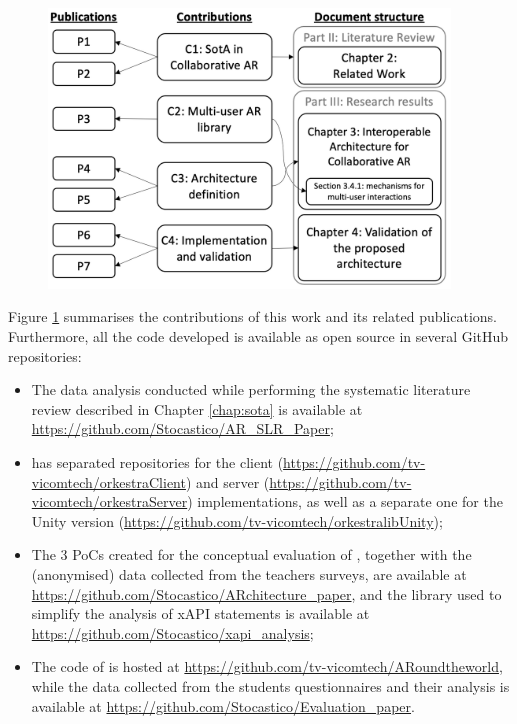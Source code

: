 \begin{figure}[htbp]
    \centering
    \includegraphics[width=0.95\textwidth]{Conclusions/figures/contrib_diagram.png}
    \caption{\fontsize{10pt}{11pt}}
    \label{fig:contribs}
\end{figure}

Figure \ref{fig:contribs} summarises the contributions of this work and its related publications.
Furthermore, all the code developed is available as open source in several GitHub repositories:

\begin{itemize}
    \item The data analysis conducted while performing the systematic literature review described in Chapter \ref{chap:sota} is available at \url{https://github.com/Stocastico/AR_SLR_Paper};
    \item \ork{} has separated repositories for the client (\url{https://github.com/tv-vicomtech/orkestraClient}) and server (\url{https://github.com/tv-vicomtech/orkestraServer}) implementations, as well as a separate one for the Unity version (\url{https://github.com/tv-vicomtech/orkestralibUnity});
    \item The 3 PoCs created for the conceptual evaluation of \arch{}, together with the (anonymised) data collected from the teachers surveys, are available at \url{https://github.com/Stocastico/ARchitecture_paper}, and the library used to simplify the analysis of xAPI statements is available at \url{https://github.com/Stocastico/xapi_analysis};
    \item The code of \appname{} is hosted at \url{https://github.com/tv-vicomtech/ARoundtheworld}, while the data collected from the students questionnaires and their analysis is available at \url{https://github.com/Stocastico/Evaluation_paper}.
\end{itemize}

